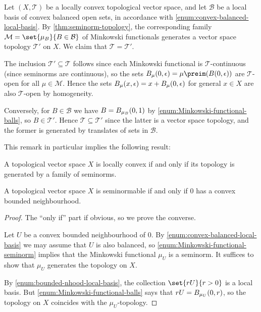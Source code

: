 \documentclass[article, a4paper, 11pt, oneside]{memoir}
\numberwithin{equation}{chapter}
\newcommand{\calT}{\mathcal{T}}
\newcommand{\calB}{\mathcal{B}}
\newcommand{\calM}{\mathcal{M}}
\begin{document}
\begin{remark}
    Let $(X,\calT)$ be a locally convex topological vector space, and let $\calB$ be a local basis of convex balanced open sets, in accordance with \cref{enum:convex-balanced-local-basis}. By \cref{thm:seminorm-topology}, the corresponding family $\calM = \set{\mu_B}{B \in \calB}$ of Minkowski functionals generates a vector space topology $\calT'$ on $X$. We claim that $\calT = \calT'$.

    The inclusion $\calT' \subseteq \calT$ follows since each Minkowski functional is $\calT$-continuous (since seminorms are continuous), so the sets $\ball[\mu]{0}{\epsilon} = \mu\preim(\ball{0}{\epsilon})$ are $\calT$-open for all $\mu \in \calM$. Hence the sets $\ball[\mu]{x}{\epsilon} = x + \ball[\mu]{0}{\epsilon}$ for general $x \in X$ are also $\calT$-open by homogeneity.

    Conversely, for $B \in \calB$ we have $B = \ball[\mu_B]{0}{1}$ by \cref{enum:Minkowski-functional-balls}, so $B \in \calT'$. Hence $\calT \subseteq \calT'$ since the latter is a vector space topology, and the former is generated by translates of sets in $\calB$.
\end{remark}
%
This remark in particular implies the following result:
%
\begin{theorem}
    \label{thm:locally-convex-iff-seminorms}
    A topological vector space $X$ is locally convex if and only if its topology is generated by a family of seminorms.
\end{theorem}


\begin{theorem}
    A topological vector space $X$ is seminormable if and only if $0$ has a convex bounded neighbourhood.
\end{theorem} %

\begin{proof}
    The \enquote{only if} part if obvious, so we prove the converse.

    Let $U$ be a convex bounded neighbourhood of $0$. By \cref{enum:convex-balanced-local-basis} we may assume that $U$ is also balanced, so \cref{enum:Minkowski-functional-seminorm} implies that the Minkowski functional $\mu_U$ is a seminorm. It suffices to show that $\mu_U$ generates the topology on $X$.

    By \cref{enum:bounded-nhood-local-basis}, the collection $\set{rU}{r > 0}$ is a local basis. But \cref{enum:Minkowski-functional-balls} says that $rU = \ball[\mu_U]{0}{r}$, so the topology on $X$ coincides with the $\mu_U$-topology.
\end{proof}
\end{document}
